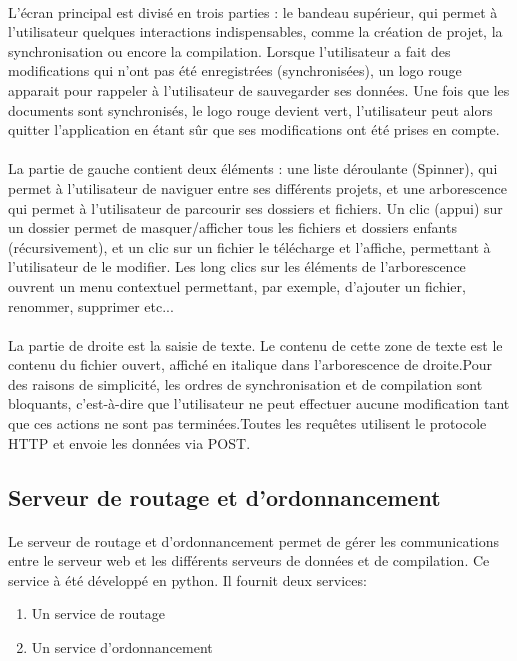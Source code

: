 \documentclass[a4paper,12pt]{article}
\begin{document}
\paragraph*{}

L'écran principal est divisé en trois parties : le bandeau supérieur, qui permet à l'utilisateur quelques interactions indispensables, comme la création de projet, la synchronisation ou encore la compilation. Lorsque l'utilisateur a fait des modifications qui 
n'ont pas été enregistrées (synchronisées), un logo rouge apparait pour rappeler à l'utilisateur de sauvegarder ses données. Une fois que les documents sont synchronisés, le logo rouge devient vert, l'utilisateur peut alors quitter l'application en étant sûr que ses 
modifications ont été prises en compte.
\paragraph*{}
La partie de gauche contient deux éléments : une liste déroulante (Spinner), qui permet à l'utilisateur de naviguer entre ses différents projets, et une arborescence qui permet à l'utilisateur de parcourir ses dossiers et fichiers. Un clic (appui) sur un dossier 
permet de masquer/afficher tous les fichiers et dossiers enfants (récursivement), et un clic sur un fichier le télécharge et l'affiche, permettant à l'utilisateur de le modifier. Les long clics sur les éléments de l'arborescence ouvrent un menu contextuel permettant, 
par exemple, d'ajouter un fichier, renommer, supprimer etc...
\paragraph*{}
La partie de droite est la saisie de texte. Le contenu de cette zone de texte est le contenu du fichier ouvert, affiché en italique dans l'arborescence de droite.Pour des raisons de simplicité, les ordres de synchronisation et de compilation sont bloquants, c'est-à-dire que l'utilisateur ne peut effectuer aucune modification tant que ces actions ne sont pas terminées.Toutes les requêtes utilisent le protocole HTTP et envoie les données via POST.


\subsection{Serveur de routage et d'ordonnancement}
\paragraph*{}
Le serveur de routage et d'ordonnancement permet de gérer les communications entre le serveur web et les différents serveurs de données et de compilation. Ce service à été développé en python. Il fournit deux services:
\begin{enumerate}
 \item Un service de routage
 \item Un service d'ordonnancement
\end{enumerate}
\end{document}
